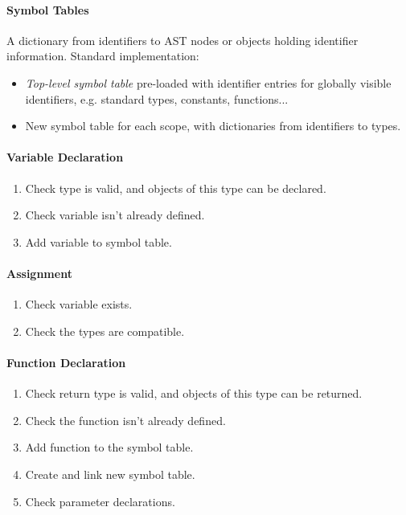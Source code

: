 \documentclass[twocolumn,english]{article}
\begin{document}
\paragraph{Symbol Tables}

A dictionary from identifiers to AST nodes or objects holding identifier
information. Standard implementation:
\begin{itemize}
\item \emph{Top-level symbol table} pre-loaded with identifier entries for
globally visible identifiers, e.g. standard types, constants, functions...
\item New symbol table for each scope, with dictionaries from identifiers
to types.
\end{itemize}

\paragraph{Variable Declaration}
\begin{enumerate}
\item Check type is valid, and objects of this type can be declared.
\item Check variable isn't already defined.
\item Add variable to symbol table.
\end{enumerate}

\paragraph{Assignment}
\begin{enumerate}
\item Check variable exists.
\item Check the types are compatible.
\end{enumerate}

\paragraph{Function Declaration}
\begin{enumerate}
\item Check return type is valid, and objects of this type can be returned.
\item Check the function isn't already defined.
\item Add function to the symbol table.
\item Create and link new symbol table.
\item Check parameter declarations.
\end{enumerate}
\end{document}
